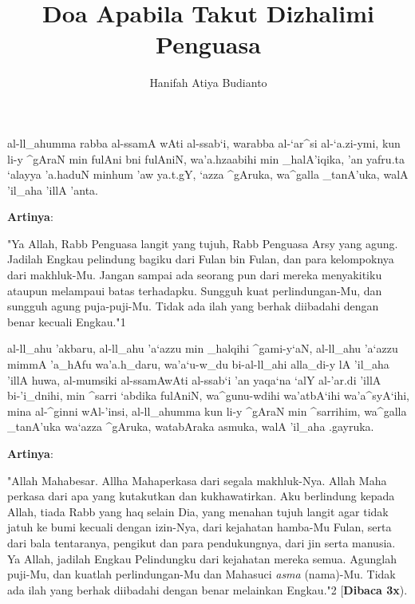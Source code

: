 \documentclass[a4paper,12pt]{article}
\title{\Large Doa Apabila Takut Dizhalimi Penguasa}
\author{\calligra Hanifah Atiya Budianto}
\begin{document}
\sffamily
\maketitle 
\fullvocalize
{}
\begin{arabtext}
\noindent
al-ll_ahumma rabba al-ssamA wAti al-ssab`i, warabba al-`ar^si al-`a.zi-ymi, 
kun li-y ^gAraN min fulAni bni fulAniN, wa'a.hzaabihi min _halA'iqika, 'an 
yafru.ta `alayya 'a.haduN minhum 'aw ya.t.gY, `azza ^gAruka, wa^galla 
_tanA'uka, walA 'il_aha 'illA 'anta.\\
\end{arabtext}
\noindent
\textbf{Artinya}:
\par
\indent
"Ya Allah, Rabb Penguasa langit yang tujuh, Rabb Penguasa Arsy yang agung. 
Jadilah Engkau pelindung bagiku dari Fulan bin Fulan, dan para kelompoknya 
dari makhluk-Mu. Jangan sampai ada seorang pun dari mereka menyakitiku 
ataupun melampaui batas terhadapku. Sungguh kuat perlindungan-Mu, dan 
sungguh agung puja-puji-Mu. Tidak ada ilah yang berhak diibadahi dengan 
benar kecuali Engkau."{\scriptsize 1}\\
\begin{arabtext}
\noindent
al-ll_ahu 'akbaru, al-ll_ahu 'a`azzu min _halqihi ^gami-y`aN, al-ll_ahu 
'a`azzu mimmA 'a_hAfu wa'a.h_daru, wa'a`u-w_du bi-al-ll_ahi alla_di-y lA 
'il_aha 'illA huwa, al-mumsiki al-ssamAwAti al-ssab`i 'an yaqa`na `alY 
al-'ar.di 'illA bi-'i_dnihi, min ^sarri `abdika fulAniN, wa^gunu-wdihi 
wa'atbA`ihi wa'a^syA`ihi, mina al-^ginni wAl-'insi, al-ll_ahumma kun li-y 
^gAraN min ^sarrihim, wa^galla _tanA'uka wa`azza ^gAruka, watabAraka 
asmuka, walA 'il_aha .gayruka.\\
\end{arabtext}
\noindent
\textbf{Artinya}:
\par
\indent
"Allah Mahabesar. Allha Mahaperkasa dari segala makhluk-Nya. Allah Maha 
perkasa dari apa yang kutakutkan dan kukhawatirkan. Aku berlindung kepada 
Allah, tiada Rabb yang haq selain Dia, yang menahan tujuh langit agar tidak
jatuh ke bumi kecuali dengan izin-Nya, dari kejahatan hamba-Mu Fulan, serta
dari bala tentaranya, pengikut dan para pendukungnya, dari jin serta 
manusia. Ya Allah, jadilah Engkau Pelindungku dari kejahatan mereka semua. 
Agunglah puji-Mu, dan kuatlah perlindungan-Mu dan Mahasuci \textit{asma} 
(nama)-Mu. Tidak ada ilah yang berhak diibadahi dengan benar melainkan 
Engkau."{\scriptsize 2} [\textbf{Dibaca 3x}).\\\\
\end{document}
